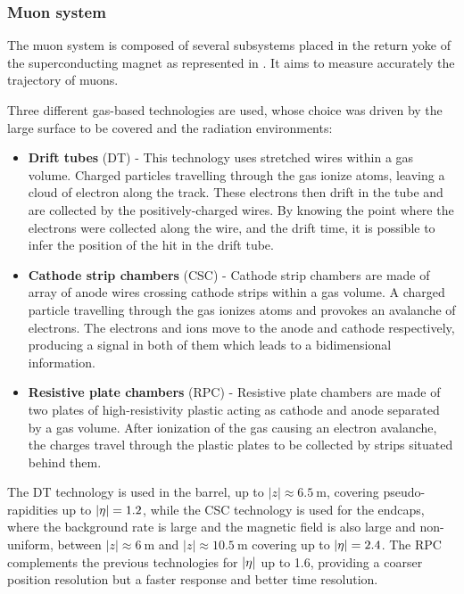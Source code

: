         \subsubsection{Muon system}

    The muon system is composed of several subsystems placed in the return yoke of
    the superconducting magnet as represented in . It aims to
    measure accurately the trajectory of muons.


    Three different gas-based technologies are used, whose choice was driven by the
    large surface to be covered and the radiation environments:
    \begin{itemize}
        \item \textbf{Drift tubes} (DT) - This technology uses stretched wires within
            a gas volume. Charged particles travelling through the gas ionize atoms,
            leaving a cloud of electron along the track. These electrons then drift
            in the tube and are collected by the positively-charged wires. By knowing
            the point where the electrons were collected along the wire, and the
            drift time, it is possible to infer the position of the hit in the drift tube.
        \item \textbf{Cathode strip chambers} (CSC) - Cathode strip chambers are
            made of array of anode wires crossing cathode strips within a gas volume.
            A charged particle travelling through the gas ionizes atoms and provokes an
            avalanche of electrons. The electrons and ions move to the anode and
            cathode respectively, producing a signal in both of them which leads to
            a bidimensional information.
        \item \textbf{Resistive plate chambers} (RPC) - Resistive plate chambers are
            made of two plates of high-resistivity plastic acting as cathode and anode
            separated by a gas volume. After ionization of the gas causing an
            electron avalanche, the charges travel through the plastic plates to be
            collected by strips situated behind them.
    \end{itemize}

    The DT technology is used in the barrel, up to $\left|z\right| \approx 6.5~\text{m}$, covering
    pseudo-rapidities up to $\left| \eta \right| = 1.2$, while the CSC technology is used for the endcaps,
    where the background rate is large and the magnetic field is also large and non-uniform,
    between $\left|z\right| \approx 6~\text{m}$ and $\left|z\right| \approx 10.5~\text{m}$
    covering up to $\left| \eta \right| = 2.4$. The RPC complements the previous technologies for
    $\left| \eta \right|$ up to 1.6, providing a coarser position resolution but a faster response
    and better time resolution.

